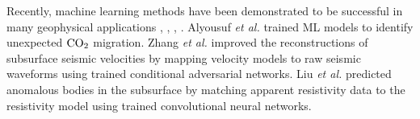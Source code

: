 \documentclass[lettersize,journal]{IEEEtran}
\begin{document}

Recently, machine learning methods have been demonstrated to be successful in many geophysical applications \cite{https://doi.org/10.1029/2021JB022581}, \cite{alyousuf_threeaxis_2024}, \cite{zhang_velocitygan_2019}, \cite{8994191}. Alyousuf \textit{et al.} \cite{alyousuf_threeaxis_2024} trained ML models to identify unexpected ${\rm CO_2}$ migration. Zhang \textit{et al.} \cite{zhang_velocitygan_2019} improved the reconstructions of subsurface seismic velocities by mapping velocity models to raw seismic waveforms using trained conditional adversarial networks. Liu \textit{et al.} \cite{8994191} predicted anomalous bodies in the subsurface by matching apparent resistivity data to the resistivity model using trained convolutional neural networks.
\end{document}
